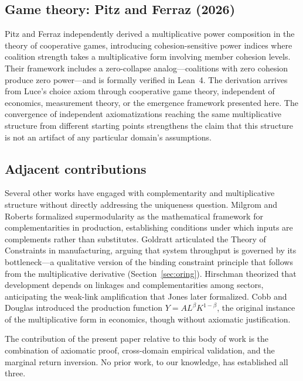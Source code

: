 \documentclass[12pt, a4paper]{article}
\theoremstyle{definition}
\theoremstyle{remark}
\begin{document}
\subsection{Game theory: Pitz and Ferraz (2026)}

Pitz and Ferraz \cite{pitz2026} independently derived a multiplicative power composition in the theory of cooperative games, introducing cohesion-sensitive power indices where coalition strength takes a multiplicative form involving member cohesion levels. Their framework includes a zero-collapse analog---coalitions with zero cohesion produce zero power---and is formally verified in Lean~4. The derivation arrives from Luce's choice axiom through cooperative game theory, independent of economics, measurement theory, or the emergence framework presented here. The convergence of independent axiomatizations reaching the same multiplicative structure from different starting points strengthens the claim that this structure is not an artifact of any particular domain's assumptions.

\subsection{Adjacent contributions}

Several other works have engaged with complementarity and multiplicative structure without directly addressing the uniqueness question. Milgrom and Roberts \cite{milgrom1990} formalized supermodularity as the mathematical framework for complementarities in production, establishing conditions under which inputs are complements rather than substitutes. Goldratt \cite{goldratt1984} articulated the Theory of Constraints in manufacturing, arguing that system throughput is governed by its bottleneck---a qualitative version of the binding constraint principle that follows from the multiplicative derivative (Section~\ref{sec:oring}). Hirschman \cite{hirschman1958} theorized that development depends on linkages and complementarities among sectors, anticipating the weak-link amplification that Jones later formalized. Cobb and Douglas \cite{cobb1928} introduced the production function $Y = A L^\beta K^{1-\beta}$, the original instance of the multiplicative form in economics, though without axiomatic justification.

The contribution of the present paper relative to this body of work is the combination of axiomatic proof, cross-domain empirical validation, and the marginal return inversion. No prior work, to our knowledge, has established all three.
\end{document}
